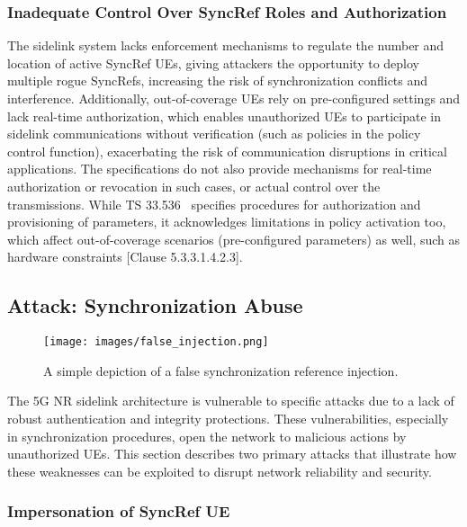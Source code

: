 \subsubsection{Inadequate Control Over SyncRef Roles and Authorization} The sidelink system lacks enforcement mechanisms to regulate the number and location of active SyncRef UEs, giving attackers the opportunity to deploy multiple rogue SyncRefs, increasing the risk of synchronization conflicts and interference. Additionally, out-of-coverage UEs rely on pre-configured settings and lack real-time authorization, which enables unauthorized UEs to participate in sidelink communications without verification (such as policies in the policy control function), exacerbating the risk of communication disruptions in critical applications. The specifications do not also provide mechanisms for real-time authorization or revocation in such cases, or actual control over the transmissions. While TS 33.536~\cite{3gpp.33.536} specifies procedures for authorization and provisioning of parameters, it acknowledges limitations in policy activation too, which affect out-of-coverage scenarios (pre-configured parameters) as well, such as hardware constraints [Clause 5.3.3.1.4.2.3].

\subsection{Attack: Synchronization Abuse}

\begin{figure}[!t]
     \centering
     \texttt{[image: images/false\_injection.png]}
     \caption{A simple depiction of a false synchronization reference injection.}
     \label{fig:false-injection}
\end{figure}

The 5G NR sidelink architecture is vulnerable to specific attacks due to a lack of robust authentication and integrity protections. These vulnerabilities, especially in synchronization procedures, open the network to malicious actions by unauthorized UEs. This section describes two primary attacks that illustrate how these weaknesses can be exploited to disrupt network reliability and security.

\subsubsection{Impersonation of SyncRef UE}

